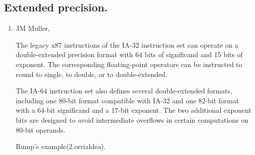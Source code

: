 \subsection*{Extended precision.}

\begin{enumerate}
\item JM Muller,

The legacy x87 instructions of the IA-32 instruction set can operate on a double-extended precision format with 64 bits of significand and 15 bits of exponent. The corresponding floating-point operators can be instructed to round to single, to double, or to double-extended.

The IA-64 instruction set also defines several double-extended formats, including one 80-bit format compatible with IA-32 and one 82-bit format with a 64-bit significand and a 17-bit exponent. The two additional exponent bits are designed to avoid intermediate overflows in certain computations on 80-bit operands.

Rump's example(2.orrialdea).

\end{enumerate}

